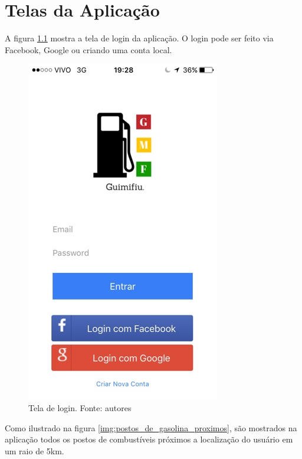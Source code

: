 
\chapter{Telas da Aplicação}
\label{chap:telas}

A figura \ref{img:tela_de_login} mostra a tela de login da aplicação. O login pode ser feito via Facebook, Google ou criando uma conta local.

\begin{figure}[H]
    \centering
    \includegraphics[scale=0.5]{figuras/app_1.jpg}
    \caption[Tela de login]{Tela de login. Fonte: autores}
    \label{img:tela_de_login}
\end{figure}

Como ilustrado na figura \ref{img:postos_de_gasolina_proximos}, são mostrados na aplicação todos os postos de combustíveis próximos a localização do usuário em um raio de 5km.

